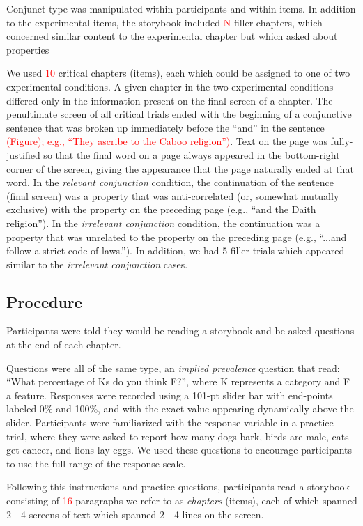 \documentclass[10pt,letterpaper]{article}
\newcommand{\red}[1]{{\textcolor{Red}{#1}}}
\begin{document}
Conjunct type was manipulated within participants and within items. 
In addition to the experimental items, the storybook included \red{N} filler chapters, which concerned similar content to the experimental chapter but which asked about properties 

We used \red{10} critical chapters (items), each which could be assigned to one of two experimental conditions.
A given chapter in the two experimental conditions differed only in the information present on the final screen of a chapter.
The penultimate screen of all critical trials ended with the beginning of a conjunctive sentence that was broken up immediately before the ``and'' in the sentence \red{(Figure); e.g., ``They ascribe to the Caboo religion'')}. 
Text on the page was fully-justified so that the final word on a page always appeared in the bottom-right corner of the screen, giving the appearance that the page naturally ended at that word.
In the \emph{relevant conjunction} condition, the continuation of the sentence (final screen) was a property that was anti-correlated (or, somewhat mutually exclusive) with the property on the preceding page (e.g., ``and the Daith religion''). 
In the \emph{irrelevant conjunction} condition, the continuation was a property that was unrelated to the property on the preceding page (e.g., ``...and follow a strict code of laws.''). 
In addition, we had 5 filler trials which appeared similar to the \emph{irrelevant conjunction} cases.


\subsection{Procedure}
Participants were told they would be reading a storybook and be asked questions at the end of each chapter. 

Questions were all of the same type, an \emph{implied prevalence} question \cite{Gelman2002, Cimpian2010} that read: ``What percentage of Ks do you think F?'', where K represents a category and F a feature. 
Responses were recorded using a 101-pt slider bar with end-points labeled 0\% and 100\%, and with the exact value appearing dynamically above the slider. 
Participants were familiarized with the response variable in a practice trial, where they were asked to report how many dogs bark, birds are male, cats get cancer, and lions lay eggs. 
We used these questions to encourage participants to use the full range of the response scale. 

Following this instructions and practice questions, participants read a storybook consisting of \red{16} paragraphs we refer to as \emph{chapters} (items), each of which spanned 2 - 4 screens of text which spanned 2 - 4 lines on the screen. 
\end{document}

